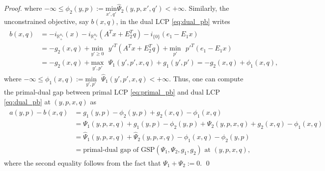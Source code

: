 \documentclass[envcountsame]{llcns2e/llncs}
\begin{document}
\begin{proof}
where $-\infty \le \phi_2(y, p) := \underset{x',q'}{\text{min}}\text{
}\hat{\Psi}_2(y, p, x', q') < +\infty$.
Similarly, the unconstrained objective, say
$b(x, q)$, in the dual LCP \eqref{eq:dual_pb} writes
\begin{eqnarray*}
  \begin{aligned}
 b(x, q) &= 
 -i_{\mathbb{R}^{n_1}_+}(x) - i_{\mathbb{R}^{n_2}_+}(A^Tx+E_2^Tq) -
 i_{\{0\}}(e_1 - E_1x)\\
    &= -g_2(x, q) + \underset{y' \geq
   0}{\text{min}}\text{ }y'^T(A^Tx + E_2^Tq) +
 \underset{p'}{\text{min}}\text{ }p'^T(e_1-E_1x)\\
    &= -g_2(x, q)
 +\underset{y',p'}{\text{max}}\text{ }\Psi_1(y', p', x, q) +
 g_1(y', p') = -g_2(x, q) + \phi_1(x, q),
   \end{aligned}
\end{eqnarray*}
where $-\infty \le \phi_1(x, q) :=
\underset{y',p'}{\text{min}}\text{ }\hat{\Psi}_1(y', p', x, q) < +\infty$.
Thus, one can compute the primal-dual gap between primal LCP
\eqref{eq:primal_pb} and dual LCP \eqref{eq:dual_pb} at $(y, p, x, q)$ as
\begin{eqnarray*}
  \begin{split}
  a(y, p) - b(x, q) &= g_1(y, p) - \phi_2(y, p) + g_2(x, q) - \phi_1(x,
  q) \\
  &= \Psi_1(y, p, x, q) +  g_1(y, p) - \phi_2(y, p) + \Psi_2(y, p, x,
  q) + g_2(x, q) - \phi_1(x, q)\\
  &= \hat{\Psi}_1(y, p, x, q) + \hat{\Psi}_2(y, p, x, q) - \phi_1(x,
  q) - \phi_2(y, p)\\
  &= \text{primal-dual gap of GSP}(\Psi_1, \Psi_2,
  g_1, g_2) \text{ at }(y, p, x, q),
  \end{split}
\end{eqnarray*}
where the second equality follows from the fact that $\Psi_1 + \Psi_2
:= 0$.
\qed



\end{proof}
\end{document}
